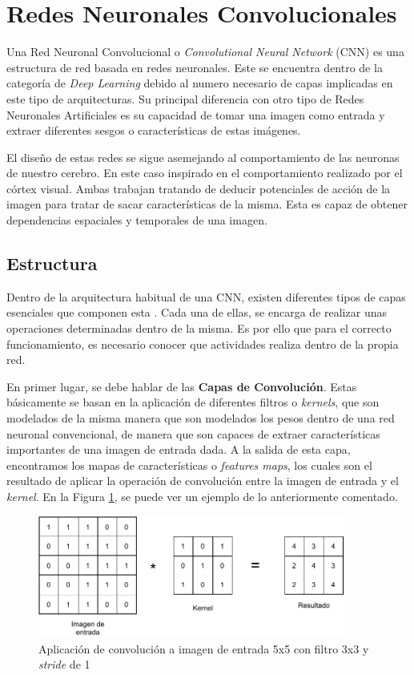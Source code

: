 \section{Redes Neuronales Convolucionales}

Una Red Neuronal Convolucional o \textit{Convolutional Neural Network} (CNN) es una estructura de red basada en redes neuronales. Este se encuentra dentro de la categoría de \textit{Deep Learning} debido al numero necesario de capas implicadas en este tipo de arquitecturas. Su principal diferencia con otro tipo de Redes Neuronales Artificiales es su capacidad de tomar una imagen como entrada y extraer diferentes sesgos o características de estas imágenes.

El diseño de estas redes se sigue asemejando al comportamiento de las neuronas de nuestro cerebro. En este caso inspirado en el comportamiento realizado por el córtex visual. Ambas trabajan tratando de deducir potenciales de acción de la imagen para tratar de sacar características de la misma. Esta es capaz de obtener dependencias espaciales y temporales de una imagen.

\subsection{Estructura}

Dentro de la arquitectura habitual de una CNN, existen diferentes tipos de capas esenciales que componen esta \cite{Aggarwal2018}. Cada una de ellas, se encarga de realizar unas operaciones determinadas dentro de la misma. Es por ello que para el correcto funcionamiento, es necesario conocer que actividades realiza dentro de la propia red.

En primer lugar, se debe hablar de las \textbf{Capas de Convolución}. Estas básicamente se basan en la aplicación de diferentes filtros o \textit{kernels}, que son modelados de la misma manera que son modelados los pesos dentro de una red neuronal convencional, de manera que son capaces de extraer características importantes de una imagen de entrada dada. A la salida de esta capa, encontramos los mapas de características o \textit{features maps}, los cuales son el resultado de aplicar la operación de convolución entre la imagen de entrada y el \textit{kernel}. En la Figura \ref{fig:convolucion}, se puede ver un ejemplo de lo anteriormente comentado.\\

\begin{figure}[!h]
\centering
\includegraphics[width=0.9\textwidth]{figuras/desarrollo teorico/Convolucion.pdf}
\caption{Aplicación de convolución a imagen de entrada 5x5 con filtro 3x3 y \textit{stride} de 1}
\label{fig:convolucion}
\end{figure}

